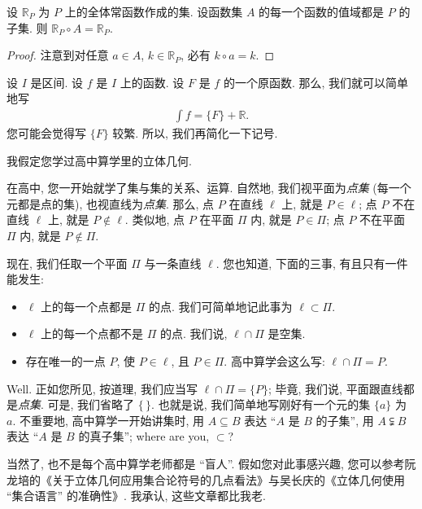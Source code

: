 \begin{theorem}
    设 $\mathbb{R}_{P}$ 为 $P$ 上的全体常函数作成的集. 设函数集 $A$ 的每一个函数的值域都是 $P$ 的子集. 则 $\mathbb{R}_{P} \circ A = \mathbb{R}_{P}$.
\end{theorem}

\begin{proof}
    注意到对任意 $a \in A$, $k \in \mathbb{R}_{P}$, 必有 $k \circ a = k$.
\end{proof}

设 $I$ 是区间. 设 $f$ 是 $I$ 上的函数. 设 $F$ 是 $f$ 的一个原函数. 那么, 我们就可以简单地写
\begin{align*}
    \int {f} = \{ F \} + \mathbb{R}.
\end{align*}
您可能会觉得写 $\{ F \}$ 较繁. 所以, 我们再简化一下记号.

\begin{example}
    我假定您学过高中算学里的立体几何.

    在高中, 您一开始就学了集与集的关系、运算. 自然地, 我们视平面为\emph{点集} (每一个元都是点的集), 也视直线为\emph{点集}. 那么, 点 $P$ 在直线 $\ell$ 上, 就是 $P \in \ell$; 点 $P$ 不在直线 $\ell$ 上, 就是 $P \notin \ell$. 类似地, 点 $P$ 在平面 $\Pi$ 内, 就是 $P \in \Pi$; 点 $P$ 不在平面 $\Pi$ 内, 就是 $P \notin \Pi$.

    现在, 我们任取一个平面 $\Pi$ 与一条直线 $\ell$. 您也知道, 下面的三事, 有且只有一件能发生:
    \begin{itemize}
        \item $\ell$ 上的每一个点都是 $\Pi$ 的点. 我们可简单地记此事为 $\ell \subset \Pi$.
        \item $\ell$ 上的每一个点都不是 $\Pi$ 的点. 我们说, $\ell \cap \Pi$ 是空集.
        \item 存在唯一的一点 $P$, 使 $P \in \ell$, 且 $P \in \Pi$. 高中算学会这么写: $\ell \cap \Pi = P$.
    \end{itemize}
    Well. 正如您所见, 按道理, 我们应当写 $\ell \cap \Pi = \{ P \}$; 毕竟, 我们说, 平面跟直线都是\emph{点集}. 可是, 我们省略了 $\{ \, \}$. 也就是说, 我们简单地写刚好有一个元的集 $\{ a \}$ 为 $a$. 不重要地, 高中算学一开始讲集时, 用 $A \subseteq B$ 表达 ``$A$ 是 $B$ 的子集'', 用 $A \subsetneqq B$ 表达 ``$A$ 是 $B$ 的真子集''; where are you, $\subset$?

    当然了, 也不是每个高中算学老师都是 ``盲人''. 假如您对此事感兴趣, 您可以参考阮龙培的《关于立体几何应用集合论符号的几点看法》与吴长庆的《立体几何使用 ``集合语言'' 的准确性》. 我承认, 这些文章都比我老.
\end{example}

